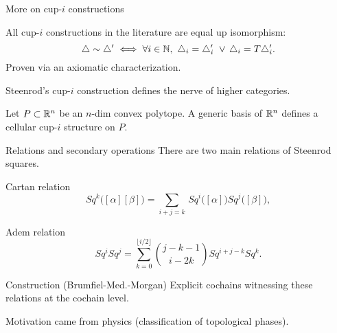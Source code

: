 \begin{frame}{More on cup-$i$ constructions}

	\pause

	\begin{theorem}[Med.]
		All cup-$i$ constructions in the literature are equal up isomorphism:
		\[
		\triangle \sim \triangle^\prime \iff \forall i \in \mathbb{N}, \ \triangle_i = \triangle_i^\prime \ \vee \, \triangle_i = T \triangle_i^\prime.
		\]
		Proven via an axiomatic characterization.
	\end{theorem}

	\bigskip\pause

	\begin{theorem}[Med.]
		Steenrod's cup-$i$ construction defines the nerve of higher categories.
	\end{theorem}

	\bigskip\pause

	\begin{theorem}
		Let $P \subset \mathbb{R}^n$ be an $n$-dim convex polytope.
		A generic basis of $\mathbb{R}^n$ defines a cellular cup-$i$ structure on $P$.
	\end{theorem}
\end{frame}

\begin{frame}{Relations and secondary operations}
	\pause
	There are two main relations of Steenrod squares.
	\begin{block}{Cartan relation}
		\vspace*{-10pt}
		\begin{equation*}
			Sq^k \big( [\alpha] [\beta] \big) =
			\sum_{i+j=k} \, Sq^i\big([\alpha]\big) Sq^j\big([\beta]\big),
		\end{equation*}
	\end{block}

	\pause

	\begin{block}{Adem relation}
		\vspace*{-15pt}
		\begin{equation*}
			Sq^i Sq^j =
			\sum_{k=0}^{\lfloor i/2 \rfloor} \binom{j-k-1}{i-2k} Sq^{i+j-k} Sq^k.
		\end{equation*}
	\end{block}

	\pause

	\begin{block}{Construction (Brumfiel-Med.-Morgan)}
		Explicit cochains witnessing these relations at the cochain level.
	\end{block}

	\pause

	Motivation came from physics (classification of topological phases).
\end{frame}